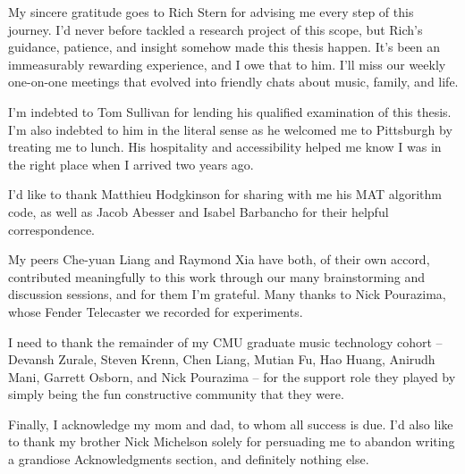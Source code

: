 \documentclass[12pt]{cmuthesis}
\begin{document}
\begin{acknowledgments}
My sincere gratitude goes to Rich Stern for advising me every step of this journey. I'd never before tackled a research project of this scope, but Rich's guidance, patience, and insight somehow made this thesis happen. It's been an immeasurably rewarding experience, and I owe that to him. I'll miss our weekly one-on-one meetings that evolved into friendly chats about music, family, and life.

I'm indebted to Tom Sullivan for lending his qualified examination of this thesis. I'm also indebted to him in the literal sense as he welcomed me to Pittsburgh by treating me to lunch. His hospitality and accessibility helped me know I was in the right place when I arrived two years ago.

I'd like to thank Matthieu Hodgkinson for sharing with me his MAT algorithm code, as well as Jacob Abesser and Isabel Barbancho for their helpful correspondence. 

My peers Che-yuan Liang and Raymond Xia have both, of their own accord, contributed meaningfully to this work through our many brainstorming and discussion sessions, and for them I'm grateful. Many thanks to Nick Pourazima, whose Fender Telecaster we recorded for experiments.

I need to thank the remainder of my CMU graduate music technology cohort -- Devansh Zurale, Steven Krenn, Chen Liang, Mutian Fu, Hao Huang, Anirudh Mani, Garrett Osborn, and Nick Pourazima -- for the support role they played by simply being the fun constructive community that they were.

Finally, I acknowledge my mom and dad, to whom all success is due. I'd also like to thank my brother Nick Michelson solely for persuading me to abandon writing a grandiose Acknowledgments section, and definitely nothing else.

\end{acknowledgments}



\tableofcontents
\listoffigures
\listoftables

\mainmatter


%
%
%
%
%
\doublespacing
\noindent
\end{document}
